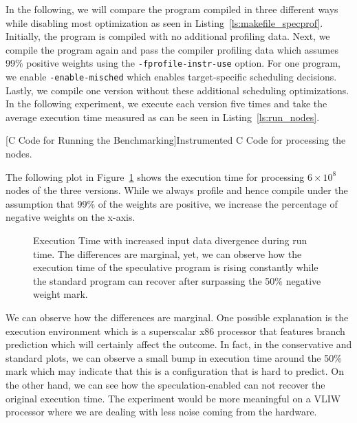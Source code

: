 In the following, we will compare the program compiled in three different ways while disabling most optimization as seen in Listing~\ref{ls:makefile_specprof}. Initially, the program is compiled with no additional profiling data. Next, we compile the program again and pass the compiler profiling data which assumes 99\% positive weights using the \texttt{-fprofile-instr-use} option. For one program, we enable \texttt{-enable-misched} which enables target-specific scheduling decisions. Lastly, we compile one version without these additional scheduling optimizations. In the following experiment, we execute each version five times and take the average execution time measured as can be seen in Listing~\ref{ls:run_nodes}.
\begin{center}
        
        \captionsetup{type=Listing}
        [C Code for Running the Benchmarking]{Instrumented C Code for processing the nodes.}
        \label{ls:run_nodes}
\end{center}
The following plot in Figure~\ref{fig:plot_specdiv} shows the execution time for processing $6\times10^8$ nodes of the three versions. While we always profile and hence compile under the assumption that 99\% of the weights are positive, we increase the percentage of negative weights on the x-axis.  
\begin{center}
    \begin{minipage}{.87\textwidth}
        \begin{figure}[H]
            \centering
            
            \caption[Execution Time with increased Input Data Divergence]{Execution Time with increased input data divergence during run time. The differences are marginal, yet, we can observe how the execution time of the speculative program is rising constantly while the standard program can recover after surpassing the 50\% negative weight mark.}
            \label{fig:plot_specdiv}
\end{figure}
    \end{minipage}
\end{center} 
We can observe how the differences are marginal. One possible explanation is the execution environment which is a superscalar x86 processor that features branch prediction which will certainly affect the outcome. In fact, in the conservative and standard plots, we can observe a small bump in execution time around the 50\% mark which may indicate that this is a configuration that is hard to predict. On the other hand, we can see how the speculation-enabled can not recover the original execution time. The experiment would be more meaningful on a VLIW processor where we are dealing with less noise coming from the hardware. 

